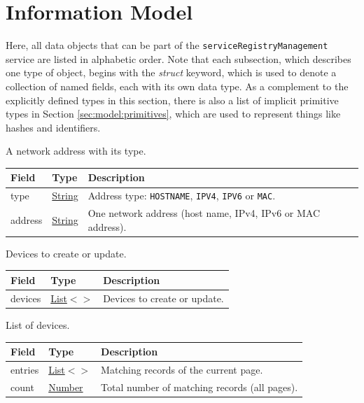 \documentclass[a4paper]{arrowhead}
\newcommand{\mref}[2][]{{\textcolor{ArrowheadPurple}{\hyperref[sec:model:#2]{\ifstrempty{#1}{#2}{#1}}}}}
\newcommand{\pref}[1]{{\textcolor{ArrowheadGrey}{\hyperref[sec:model:primitives:#1]{#1}}}}
\begin{document}
\newpage

\section{Information Model}
\label{sec:model}

Here, all data objects that can be part of the \texttt{service\allowbreak{}Registry\allowbreak{}Management} service are listed in alphabetic order.
Note that each subsection, which describes one type of object, begins with the \textit{struct} keyword, which is used to denote a collection of named fields, each with its own data type.
As a complement to the explicitly defined types in this section, there is also a list of implicit primitive types in Section \ref{sec:model:primitives}, which are used to represent things like hashes and identifiers.


A network address with its type.


\noindent\begin{tabularx}{\textwidth}{| >{\raggedright\arraybackslash}p{3.9cm} | >{\raggedright\arraybackslash\small}p{5.3cm} | X |} \hline
\rowcolor{gray!33} Field & Type & Description \\ \hline
type & \pref{String} & Address type: \texttt{HOSTNAME}, \texttt{IPV4}, \texttt{IPV6} or \texttt{MAC}. \\ \hline
address & \pref{String} & One network address (host name, IPv4, IPv6 or MAC address). \\ \hline
\end{tabularx}




Devices to create or update.


\noindent\begin{tabularx}{\textwidth}{| >{\raggedright\arraybackslash}p{3.9cm} | >{\raggedright\arraybackslash\small}p{5.3cm} | X |} \hline
\rowcolor{gray!33} Field & Type & Description \\ \hline
devices & \pref{List}$<$\allowbreak{}\mref{DeviceRequest}$>$ & Devices to create or update. \\ \hline
\end{tabularx}




List of devices.


\noindent\begin{tabularx}{\textwidth}{| >{\raggedright\arraybackslash}p{3.9cm} | >{\raggedright\arraybackslash\small}p{5.3cm} | X |} \hline
\rowcolor{gray!33} Field & Type & Description \\ \hline
entries & \pref{List}$<$\allowbreak{}\mref{DeviceResponse}$>$ & Matching records of the current page. \\ \hline
count & \pref{Number} & Total number of matching records (all pages). \\ \hline
\end{tabularx}
\end{document}
